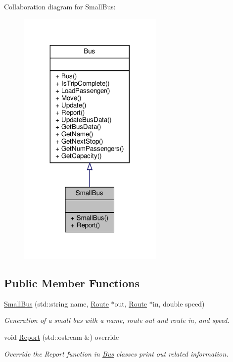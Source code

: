 Collaboration diagram for Small\+Bus\+:\nopagebreak
\begin{figure}[H]
\begin{center}
\leavevmode
\includegraphics[width=200pt]{classSmallBus__coll__graph}
\end{center}
\end{figure}
\subsection*{Public Member Functions}
\begin{DoxyCompactItemize}
\item 
\hyperlink{classSmallBus_aa1958f7674de8eede37239a5e199afaf}{Small\+Bus} (std\+::string name, \hyperlink{classRoute}{Route} $\ast$out, \hyperlink{classRoute}{Route} $\ast$in, double speed)
\begin{DoxyCompactList}\small\item\em Generation of a small bus with a name, route out and route in, and speed. \end{DoxyCompactList}\item 
void \hyperlink{classSmallBus_a5759f6dd8c3738962730b6f0e28a9c05}{Report} (std\+::ostream \&) override
\begin{DoxyCompactList}\small\item\em Override the Report function in \hyperlink{classBus}{Bus} classes print out related information. \end{DoxyCompactList}\end{DoxyCompactItemize}


